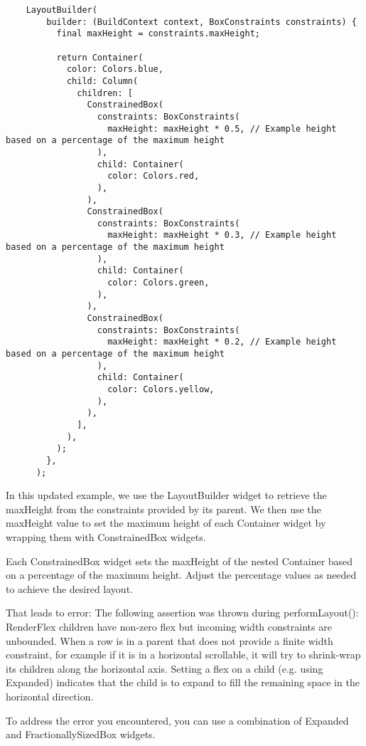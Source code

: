\begin{lstlisting}
    LayoutBuilder(
        builder: (BuildContext context, BoxConstraints constraints) {
          final maxHeight = constraints.maxHeight;
      
          return Container(
            color: Colors.blue,
            child: Column(
              children: [
                ConstrainedBox(
                  constraints: BoxConstraints(
                    maxHeight: maxHeight * 0.5, // Example height based on a percentage of the maximum height
                  ),
                  child: Container(
                    color: Colors.red,
                  ),
                ),
                ConstrainedBox(
                  constraints: BoxConstraints(
                    maxHeight: maxHeight * 0.3, // Example height based on a percentage of the maximum height
                  ),
                  child: Container(
                    color: Colors.green,
                  ),
                ),
                ConstrainedBox(
                  constraints: BoxConstraints(
                    maxHeight: maxHeight * 0.2, // Example height based on a percentage of the maximum height
                  ),
                  child: Container(
                    color: Colors.yellow,
                  ),
                ),
              ],
            ),
          );
        },
      );      
\end{lstlisting}

In this updated example, we use the LayoutBuilder widget to retrieve the maxHeight from the constraints provided by 
its parent. We then use the maxHeight value to set the maximum height of each Container widget by wrapping 
them with ConstrainedBox widgets.

Each ConstrainedBox widget sets the maxHeight of the nested Container based on a percentage of the maximum height. 
Adjust the percentage values as needed to achieve the desired layout.

That leads to error: The following assertion was thrown during performLayout():
RenderFlex children have non-zero flex but incoming width constraints are unbounded.
When a row is in a parent that does not provide a finite width constraint, for example if it is in a
horizontal scrollable, it will try to shrink-wrap its children along the horizontal axis. Setting a
flex on a child (e.g. using Expanded) indicates that the child is to expand to fill the remaining
space in the horizontal direction.

To address the error you encountered, you can use a combination of Expanded and FractionallySizedBox widgets. 

